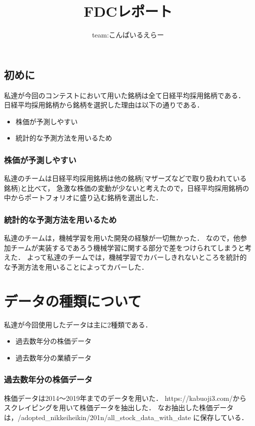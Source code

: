 \documentclass{jsarticle}
\begin{document}
\title{FDCレポート}
\author{team:こんぱいるえらー}
\maketitle

\subsection{初めに}

私達が今回のコンテストにおいて用いた銘柄は全て日経平均採用銘柄である．
日経平均採用銘柄から銘柄を選択した理由は以下の通りである．

\begin{itemize}
\item 株価が予測しやすい
\item 統計的な予測方法を用いるため
\end{itemize}

\subsubsection{株価が予測しやすい}
私達のチームは日経平均採用銘柄は他の銘柄(マザーズなどで取り扱われている銘柄)と比べて，
急激な株価の変動が少ないと考えたので，日経平均採用銘柄の中からポートフォリオに盛り込む銘柄を選出した．

\subsubsection{統計的な予測方法を用いるため}
私達のチームは，機械学習を用いた開発の経験が一切無かった．
なので，他参加チームが実装するであろう機械学習に関する部分で差をつけられてしまうと考えた．
よって私達のチームでは，機械学習でカバーしきれないところを統計的な予測方法を用いることによってカバーした．

\section{データの種類について}
私達が今回使用したデータは主に2種類である．
\begin{itemize}
\item 過去数年分の株価データ
\item 過去数年分の業績データ
\end{itemize}

\subsubsection{過去数年分の株価データ}
株価データは2014〜2019年までのデータを用いた．
https:\slash{}\slash{}kabuoji3.com\slash からスクレイピングを用いて株価データを抽出した．
なお抽出した株価データは，\slash{}adopted\_nikkeiheikin\slash{}201n\slash{}all\_stock\_data\_with\_date に保存している．
\end{document}
